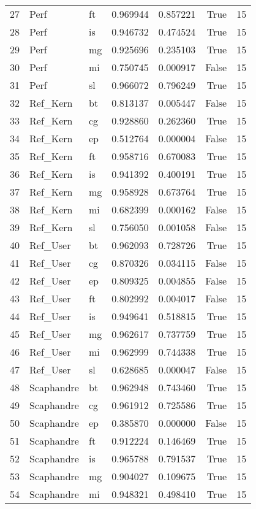 \begin{tabular}{lllrrrr}
27 & Perf & ft & 0.969944 & 0.857221 & True & 15 \\
28 & Perf & is & 0.946732 & 0.474524 & True & 15 \\
29 & Perf & mg & 0.925696 & 0.235103 & True & 15 \\
30 & Perf & mi & 0.750745 & 0.000917 & False & 15 \\
31 & Perf & sl & 0.966072 & 0.796249 & True & 15 \\
32 & Ref_Kern & bt & 0.813137 & 0.005447 & False & 15 \\
33 & Ref_Kern & cg & 0.928860 & 0.262360 & True & 15 \\
34 & Ref_Kern & ep & 0.512764 & 0.000004 & False & 15 \\
35 & Ref_Kern & ft & 0.958716 & 0.670083 & True & 15 \\
36 & Ref_Kern & is & 0.941392 & 0.400191 & True & 15 \\
37 & Ref_Kern & mg & 0.958928 & 0.673764 & True & 15 \\
38 & Ref_Kern & mi & 0.682399 & 0.000162 & False & 15 \\
39 & Ref_Kern & sl & 0.756050 & 0.001058 & False & 15 \\
40 & Ref_User & bt & 0.962093 & 0.728726 & True & 15 \\
41 & Ref_User & cg & 0.870326 & 0.034115 & False & 15 \\
42 & Ref_User & ep & 0.809325 & 0.004855 & False & 15 \\
43 & Ref_User & ft & 0.802992 & 0.004017 & False & 15 \\
44 & Ref_User & is & 0.949641 & 0.518815 & True & 15 \\
45 & Ref_User & mg & 0.962617 & 0.737759 & True & 15 \\
46 & Ref_User & mi & 0.962999 & 0.744338 & True & 15 \\
47 & Ref_User & sl & 0.628685 & 0.000047 & False & 15 \\
48 & Scaphandre & bt & 0.962948 & 0.743460 & True & 15 \\
49 & Scaphandre & cg & 0.961912 & 0.725586 & True & 15 \\
50 & Scaphandre & ep & 0.385870 & 0.000000 & False & 15 \\
51 & Scaphandre & ft & 0.912224 & 0.146469 & True & 15 \\
52 & Scaphandre & is & 0.965788 & 0.791537 & True & 15 \\
53 & Scaphandre & mg & 0.904027 & 0.109675 & True & 15 \\
54 & Scaphandre & mi & 0.948321 & 0.498410 & True & 15 \\

\end{tabular}
